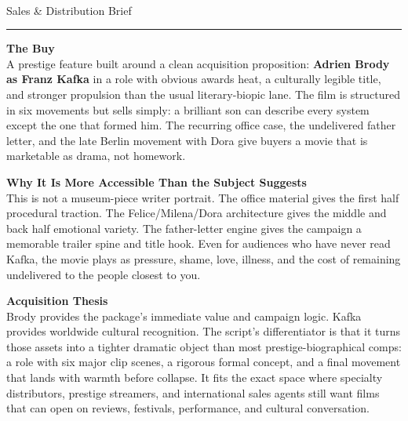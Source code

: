 \documentclass[11pt,letterpaper]{article}
\begin{document}
\begin{center}
{\Large\bfseries\sffamily \filmtitleupper}\\[3pt]
{\normalsize\sffamily\color{kafkagray} Sales \& Distribution Brief}
\end{center}
\vspace{2pt}
\textcolor{sectionrule}{\rule{\textwidth}{0.5pt}}
\vspace{4pt}

\textbf{The Buy}\\
A prestige feature built around a clean acquisition proposition: \textbf{Adrien Brody as Franz Kafka} in a role with obvious awards heat, a culturally legible title, and stronger propulsion than the usual literary-biopic lane. The film is structured in six movements but sells simply: a brilliant son can describe every system except the one that formed him. The recurring office case, the undelivered father letter, and the late Berlin movement with Dora give buyers a movie that is marketable as drama, not homework.

\vspace{2pt}

\textbf{Why It Is More Accessible Than the Subject Suggests}\\
This is not a museum-piece writer portrait. The office material gives the first half procedural traction. The Felice/Milena/Dora architecture gives the middle and back half emotional variety. The father-letter engine gives the campaign a memorable trailer spine and title hook. Even for audiences who have never read Kafka, the movie plays as pressure, shame, love, illness, and the cost of remaining undelivered to the people closest to you.

\vspace{2pt}

\textbf{Acquisition Thesis}\\
Brody provides the package's immediate value and campaign logic. Kafka provides worldwide cultural recognition. The script's differentiator is that it turns those assets into a tighter dramatic object than most prestige-biographical comps: a role with six major clip scenes, a rigorous formal concept, and a final movement that lands with warmth before collapse. It fits the exact space where specialty distributors, prestige streamers, and international sales agents still want films that can open on reviews, festivals, performance, and cultural conversation.

\vspace{2pt}
\end{document}
